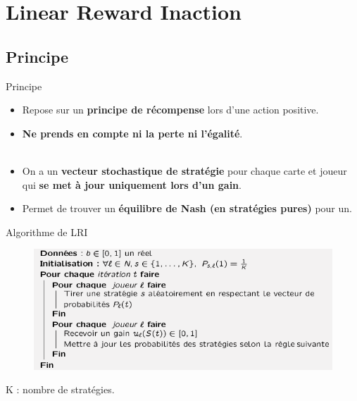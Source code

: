\section{Linear Reward Inaction}
\subsection{Principe}
\begin{frame}{Principe}
\begin{itemize}
    \item Repose sur un \textbf{principe de récompense} lors d'une action positive.
    \item \textbf{Ne prends en compte ni la perte ni l'égalité}.\\~\
    \item On a un \textbf{vecteur stochastique de stratégie} pour chaque carte et joueur qui \textbf{se met à jour uniquement lors d'un gain}.
    \item Permet de trouver un \textbf{équilibre de Nash (en stratégies pures)} pour un.
\end{itemize}
\end{frame}

\begin{frame}{Algorithme de LRI}
\begin{figure}
    \centering
    \includegraphics[width=\textwidth]{Images/algo/13.png}
    \label{fig:my_label}
\end{figure}
\centering K : nombre de stratégies.


\end{frame}

